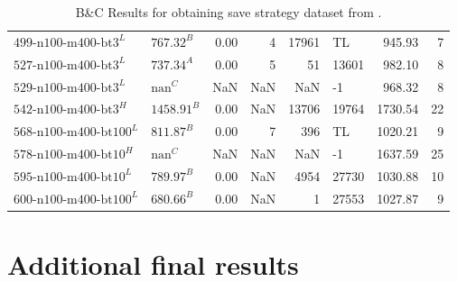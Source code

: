 \begin{table}[ht]
\begin{tabular}{llrrrlrr}
		$\text{499-n100-m400-bt3}^L$   & $\text{767.32}^B$  & 0.00 & 4     & 17961  & TL    & 945.93  & 7     \\
		$\text{527-n100-m400-bt3}^L$   & $\text{737.34}^A$  & 0.00 & 5     & 51     & 13601 & 982.10  & 8     \\
		$\text{529-n100-m400-bt3}^L$   & $\text{nan}^C$     & NaN  & NaN   & NaN    & -1    & 968.32  & 8     \\
		$\text{542-n100-m400-bt3}^H$   & $\text{1458.91}^B$ & 0.00 & NaN   & 13706  & 19764 & 1730.54 & 22    \\
		$\text{568-n100-m400-bt100}^L$ & $\text{811.87}^B$  & 0.00 & 7     & 396    & TL    & 1020.21 & 9     \\
		$\text{578-n100-m400-bt10}^H$  & $\text{nan}^C$     & NaN  & NaN   & NaN    & -1    & 1637.59 & 25    \\
		$\text{595-n100-m400-bt10}^L$  & $\text{789.97}^B$  & 0.00 & NaN   & 4954   & 27730 & 1030.88 & 10    \\
		$\text{600-n100-m400-bt100}^L$ & $\text{680.66}^B$  & 0.00 & NaN   & 1      & 27553 & 1027.87 & 9     \\
		\bottomrule
	\end{tabular}
	\caption{B\&C Results for obtaining save strategy dataset from \krebsADataSet.}
	\label{tab:bc_results_krebs}
\end{table}

\clearpage
\section{Additional final results}
\label{sec_final_comparison_results}

